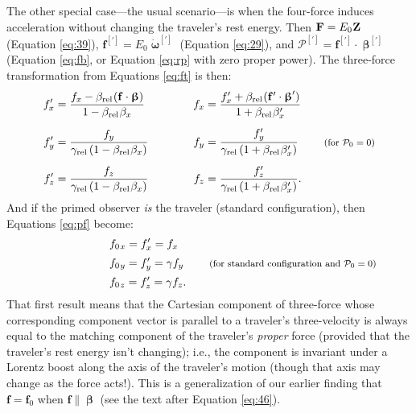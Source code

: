 \documentclass[12pt]{article}
\renewcommand{\vv}[1]{\mathbf{#1}}
\newcommand{\vvbeta}{\bm{\upbeta}}
\newcommand{\vvomega}{\bm{\upomega}}
\begin{document}
The other special case---the usual scenario---is when the four-force induces acceleration without changing the traveler's rest energy. Then $\vv F = E_0 \mkern.5mu \vv Z$ (Equation \ref{eq:39}), $\vv f^{[\prime]} = E_0 \dot{\vvomega}^{[\prime]}$ (Equation \ref{eq:29}), and $\mathcal{P}^{[\prime]} = \vv f^{[\prime]} \cdot \vvbeta^{[\prime]}$ (Equation \ref{eq:fb}, or Equation \ref{eq:rp} with zero proper power). The three-force transformation from Equations \ref{eq:ft} is then:
\begin{equation*}
\begin{aligned}
f_x^\prime &= \dfrac{f_x - \beta_{\textrm{rel}} \mkern1mu ( \vv f \cdot \vvbeta ) }{1 - \beta_{\textrm{rel}} \mkern1mu \beta_x} & f_x &= \dfrac{ f^\prime_x + \beta_{\textrm{rel}} \mkern1mu ( \vv f^\prime \cdot \vvbeta^\prime ) }{1 + \beta_{\textrm{rel}} \mkern1mu \beta^\prime_x} \\[5pt]
f_y^\prime &= \dfrac{f_y}{\gamma_{\textrm{rel}} \left( 1 - \beta_{\textrm{rel}} \mkern1mu \beta_x \right) } \qquad \quad & f_y &= \dfrac{f^\prime_y}{\gamma_{\textrm{rel}} \left( 1 + \beta_{\textrm{rel}} \mkern1mu \beta^\prime_x \right) } \qquad \textrm{\footnotesize{ (for $\mathcal{P}_0 = 0$)}} \\[5pt]
f_z^\prime &= \dfrac{f_z}{\gamma_{\textrm{rel}} \left( 1 - \beta_{\textrm{rel}} \mkern1mu \beta_x \right) } & f_z &= \dfrac{f^\prime_z}{\gamma_{\textrm{rel}} \left( 1 + \beta_{\textrm{rel}} \mkern1mu \beta^\prime_x \right) } .
\end{aligned}
\end{equation*}
And if the primed observer \emph{is} the traveler (standard configuration), then Equations \ref{eq:pf} become:
\begin{equation*}
\begin{aligned}
\qquad \qquad \qquad & f_{0 \mkern1.5mu x} = f_x^\prime = f_x \\[2pt]
& f_{0 \mkern1.5mu y} = f_y^\prime = \gamma f_y \qquad \textrm{\footnotesize{ (for standard configuration and $\mathcal{P}_0 = 0$)}} \\[2pt]
& f_{0 \mkern1.5mu z} = f_z^\prime = \gamma f_z .
\end{aligned}
\end{equation*}
That first result means that the Cartesian component of three-force whose corresponding component vector is parallel to a traveler's three-velocity is always equal to the matching component of the traveler's \emph{proper} force (provided that the traveler's rest energy isn't changing); i.e., the component is invariant under a Lorentz boost along the axis of the traveler's motion (though that axis may change as the force acts!). This is a generalization of our earlier finding that $\vv f = \vv f_0$ when $\vv f \parallel \vvbeta$ (see the text after Equation \ref{eq:46}).
\end{document}
